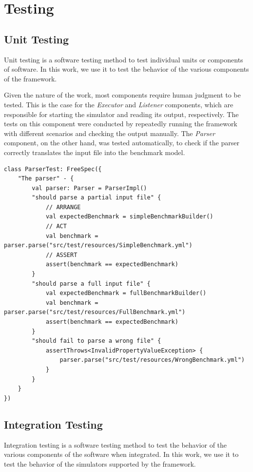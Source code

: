 \documentclass[12pt,a4paper,openright,twoside]{book}
\begin{document}
\section{Testing}

\subsection{Unit Testing}
Unit testing is a software testing method to test individual units or components of software.
In this work, we use it to test the behavior of the various components of the framework.

Given the nature of the work, most components require human judgment to be tested. 
This is the case for the \emph{Executor} and \emph{Listener} components, which are responsible for starting the simulator and reading its output, respectively.
The tests on this component were conducted by repeatedly running the framework with different scenarios and checking the output manually.
The \emph{Parser} component, on the other hand, was tested automatically, to check if the parser correctly translates the input file into the benchmark model.

\begin{lstlisting}[style=my-kotlin, language=my-kotlin, caption={Parser tests.}]
  class ParserTest: FreeSpec({
    "The parser" - {
        val parser: Parser = ParserImpl()
        "should parse a partial input file" {
            // ARRANGE
            val expectedBenchmark = simpleBenchmarkBuilder()
            // ACT
            val benchmark = parser.parse("src/test/resources/SimpleBenchmark.yml")
            // ASSERT
            assert(benchmark == expectedBenchmark)
        }
        "should parse a full input file" {
            val expectedBenchmark = fullBenchmarkBuilder()
            val benchmark = parser.parse("src/test/resources/FullBenchmark.yml")
            assert(benchmark == expectedBenchmark)
        }
        "should fail to parse a wrong file" {
            assertThrows<InvalidPropertyValueException> {
                parser.parse("src/test/resources/WrongBenchmark.yml")
            }
        }
    }
})
\end{lstlisting}

\subsection{Integration Testing}

Integration testing is a software testing method to test the behavior of the various components of the software when integrated.
In this work, we use it to test the behavior of the simulators supported by the framework.
\end{document}
